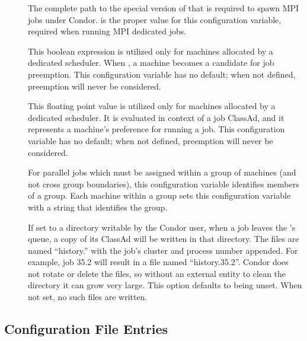 \begin{description}
\item[]
  \label{param:MPICondorRshPath} The complete path to the
  special version of  that is required to spawn MPI
  jobs under Condor.
   is the proper value for this 
  configuration variable, required when running MPI dedicated jobs.

\item[]
  \label{param:ScheddPreemptionRequirements}
  This boolean expression is
  utilized only for machines allocated by a dedicated scheduler.
  When , a machine becomes a candidate for job preemption.
  This configuration variable has no default;
  when not defined, preemption will never be considered.

\item[]
  \label{param:ScheddPreemptionRank}
  This floating point value is
  utilized only for machines allocated by a dedicated scheduler.
  It is evaluated in context of a job ClassAd,
  and it represents a machine's preference for running a job.
  This configuration variable has no default;
  when not defined, preemption will never be considered.

\item[]
  \label{param:ParallelSchedulingGroup}
  For parallel jobs which must be assigned within a group
  of machines (and not cross group boundaries),
  this configuration variable identifies members of a group. 
  Each machine within a group sets this configuration variable with 
  a string that identifies the group.

\item[]
  \label{param:PerJobHistoryDir}
  If set to a directory writable by the Condor user, when a job
  leaves the 's queue, a copy of its ClassAd will
  be written in that directory.  The files are named ``history.''
  with the job's cluster and process number appended.  For
  example, job 35.2 will result in a file named ``history.35.2''.
  Condor does not rotate or delete the files, so without an
  external entity to clean the directory it can grow very large.
  This option defaults to being unset.  When not set, no such
  files are written.

\end{description}

\subsection{\label{sec:Shadow-Config-File-Entries}
Configuration File Entries}

